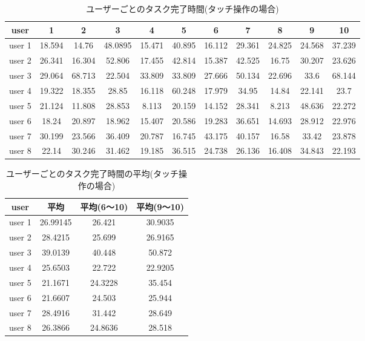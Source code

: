 \documentclass[11pt,a4j, titlepage]{jarticle} %
\begin{document}
\begin{table}[H]
	\begin{center}
	\begin{tabular}{|c|c|c|c|c|c|c|c|c|c|c|} \hline
		user & 1 & 2 & 3 & 4 & 5 & 6 & 7 & 8 & 9 & 10\\ \hline \hline
		user 1 & 18.594 & 14.76 & 48.0895 & 15.471 & 40.895 & 16.112 & 29.361 & 24.825 & 24.568 & 37.239 \\
		user 2 &  26.341 & 16.304 & 52.806 & 17.455 & 42.814 & 15.387 & 42.525 & 16.75 & 30.207 & 23.626 \\
		user 3 &  29.064 & 68.713 & 22.504 & 33.809 & 33.809 & 27.666 & 50.134 & 22.696 & 33.6 & 68.144\\
		user 4 &  19.322 & 18.355 & 28.85 & 16.118 & 60.248 & 17.979 & 34.95 & 14.84 & 22.141 & 23.7\\
		user 5 &  21.124 & 11.808 & 28.853 & 8.113 & 20.159 & 14.152 & 28.341 & 8.213 & 48.636 & 22.272\\
		user 6 &  18.24 & 20.897 & 18.962 & 15.407 & 20.586 & 19.283 & 36.651 & 14.693 & 28.912 & 22.976\\
		user 7 &  30.199 & 23.566 & 36.409 & 20.787 & 16.745 & 43.175 & 40.157 & 16.58 & 33.42 & 23.878\\
		user 8 &  22.14 & 30.246 & 31.462 & 19.185 & 36.515 & 24.738 & 26.136 & 16.408 & 34.843 & 22.193\\ \hline
	\end{tabular}
	\caption{ユーザーごとのタスク完了時間(タッチ操作の場合)}
	\label{table10}
	\end{center}
\end{table}

\begin{table}[H]
	\begin{center}
	\begin{tabular}{|c|c|c|c|} \hline
		user & 平均 & 平均(6～10) & 平均(9～10)\\ \hline \hline
		user 1 & 26.99145 & 26.421 & 30.9035\\
		user 2 & 28.4215 & 25.699 & 26.9165\\
		user 3 & 39.0139 & 40.448 & 50.872\\
		user 4 & 25.6503 & 22.722 & 22.9205\\
		user 5 & 21.1671 & 24.3228 & 35.454\\
		user 6 & 21.6607 & 24.503 & 25.944\\
		user 7 & 28.4916 & 31.442 & 28.649\\
		user 8 & 26.3866 & 24.8636 & 28.518\\ \hline
	\end{tabular}
	\caption{ユーザーごとのタスク完了時間の平均(タッチ操作の場合)}
	\label{table12}
	\end{center}
\end{table}
\end{document}
